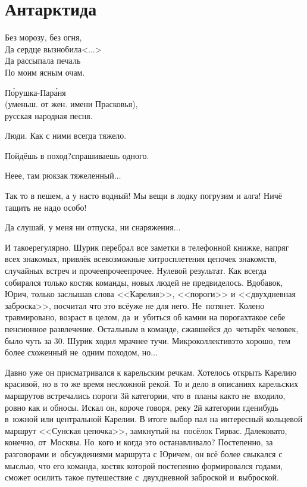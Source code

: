 {
	\chapter{Антарктида}
	\vepsianrose
	
	\fancyhead[LE]{\fancyplain{}{\bfseries \parttitle}}
	\fancyhead[RO]{\fancyplain{}{\bfseries \rightmark}}
	
	\epigraph{%
		Без морозу, без огня,\\
		Да сердце вызнобила<$\ldots$>\\
		Да рассыпала печаль\\
		По моим ясным очам.
	}	
	{
		\begin{flushright}
			\small{П\'орушка-Пар\'аня\\(уменьш. от жен. имени Прасковья),\\русская народная песня.}
		\end{flushright}
	}
	
	Люди. Как с ними всегда тяжело.
	
	\diagdash Пойдёшь в поход?\mdash спрашиваешь одного.
	
	\diagdash Не\sdash е\sdash е, там рюкзак тяжеленный$\ldots$
	
	\diagdash Так то в пешем, а у нас\sdash то водный! Мы вещи в лодку погрузим и алга! Ничё тащить не надо особо!
	
	\diagdash Да слушай, у меня ни отпуска, ни снаряжения$\ldots$
	
	И такое\mdash регулярно. Шурик перебрал все заметки в телефонной книжке, напряг всех знакомых, привлёк всевозможные хитросплетения цепочек знакомств, случайных встреч и прочее\sdash прочее\sdash прочее. Нулевой результат. Как всегда собирался только костяк команды, новых людей не предвиделось. Вдобавок, Юрич, только заслышав слова <<Карелия>>, <<пороги>> и <<двухдневная заброска>>, посчитал что это всё\mdash уже не для него. Не~потянет. Колено травмировано, возраст в целом, да~и~убиться об камни на порогах\mdash такое себе пенсионное развлечение. Остальным в команде, сжавшейся до~четырёх человек, было чуть за 30. Шурик ходил мрачнее тучи. Микроколлектив\mdash это хорошо, тем более схоженный не~одним походом, но$\ldots$
	
	Давно уже он присматривался к карельским речкам. Хотелось открыть Карелию красивой, но в то же время несложной рекой. То и дело в описаниях карельских маршрутов встречались пороги 3\sdash й категории, что в~планы как\sdash то не~входило, ровно как и обносы. Искал он, короче говоря, реку 2\sdash й категории где\sdash нибудь в~южной или центральной Карелии. В итоге выбор пал на интересный кольцевой маршрут <<Сунская цепочка>>, замкнутый на~посёлок Гирвас. Далековато, конечно, от~Москвы. Но~кого и когда это останавливало? Постепенно, за разговорами и~обсуждениями маршрута с Юричем, он всё более свыкался с мыслью, что его команда, костяк которой постепенно формировался годами, сможет осилить такое путешествие с~двухдневной заброской и~выброской. 
	
}
